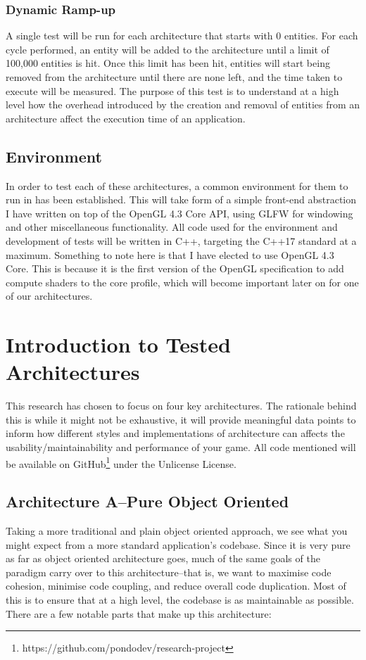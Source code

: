\documentclass{article}
\begin{document}
\subsubsection{Dynamic Ramp-up}
A single test will be run for each architecture that starts with 0 entities. For
each cycle performed, an entity will be added to the architecture until a limit
of 100,000 entities is hit. Once this limit has been hit, entities will start
being removed from the architecture until there are none left, and the time
taken to execute will be measured. The purpose of this test is to understand at
a high level how the overhead introduced by the creation and removal of entities
from an architecture affect the execution time of an application.

\subsection{Environment}
In order to test each of these architectures, a common environment for them to
run in has been established. This will take form of a simple front-end
abstraction I have written on top of the OpenGL 4.3 Core API, using GLFW for
windowing and other miscellaneous functionality. All code used for the
environment and development of tests will be written in C++, targeting the C++17
standard at a maximum. Something to note here is that I have elected to use
OpenGL 4.3 Core. This is because it is the first version of the OpenGL
specification to add compute shaders to the core profile, which will become
important later on for one of our architectures.

\section{Introduction to Tested Architectures}
This research has chosen to focus on four key architectures. The rationale
behind this is while it might not be exhaustive, it will provide meaningful
data points to inform how different styles and implementations of architecture
can affects the usability/maintainability and performance of your game. All
code mentioned will be available on
GitHub\footnote{https://github.com/pondodev/research-project} under the
Unlicense License.

\subsection{Architecture A--Pure Object Oriented}
Taking a more traditional and plain object oriented approach, we see what you
might expect from a more standard application's codebase. Since it is very pure
as far as object oriented architecture goes, much of the same goals of the
paradigm carry over to this architecture--that is, we want to maximise code
cohesion, minimise code coupling, and reduce overall code duplication. Most of
this is to ensure that at a high level, the codebase is as maintainable as
possible. There are a few notable parts that make up this architecture:
\end{document}
